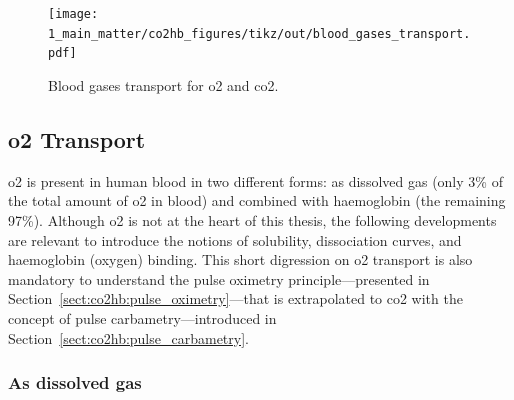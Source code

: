 
\begin{figure}
	\centering
	\texttt{[image: 1\_main\_matter/co2hb\_figures/tikz/out/blood\_gases\_transport.pdf]}
	\caption{Blood gases transport for \gls{o2} and \gls{co2}.}
	\label{fig:co2hb:blood_gases_transport}
\end{figure}

\subsection{\texorpdfstring{\gls{o2}}{O2} Transport}\label{subsect:co2hb:o2_transport}

\gls{o2} is present in human blood in two different forms: as dissolved gas (only 3\% of the total amount of \gls{o2} in blood) and combined with haemoglobin (the remaining 97\%). Although \gls{o2} is not at the heart of this thesis, the following developments are relevant to introduce the notions of solubility, dissociation curves, and haemoglobin (oxygen) binding. This short digression on \gls{o2} transport is also mandatory to understand the pulse oximetry principle---presented in Section~\ref{sect:co2hb:pulse_oximetry}---that is extrapolated to \gls{co2} with the concept of pulse carbametry---introduced in Section~\ref{sect:co2hb:pulse_carbametry}.

\subsubsection{As dissolved gas}

